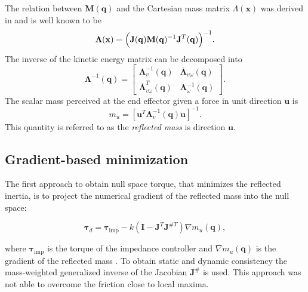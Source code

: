 The relation between $\mathbf{M}(\mathbf{q})$ and the Cartesian mass matrix $\Lambda(\mathbf{x})$ was derived in \cite{khatib1995} and is well known to be 
\begin{equation}
\mathbf{\Lambda}(\mathbf{x}) = \Bigl ( \mathbf{J}(\mathbf{q}) \mathbf{M}(\mathbf{q})^{-1} \mathbf{J}^{T}(\mathbf{q}) \Bigr )^{-1}. \label{eq:lambda}
\end{equation}
The inverse of the kinetic energy matrix can be decomposed into
\begin{equation}
\mathbf{\Lambda}^{-1}(\mathbf{q}) = 
\begin{bmatrix}
\mathbf{\Lambda}_{v}^{-1}(\mathbf{q}) & \overline{\mathbf{\Lambda}}_{v\omega}(\mathbf{q}) \\
\overline{\mathbf{\Lambda}}_{v\omega}^T(\mathbf{q}) & \mathbf{\Lambda}_{\omega}^{-1}(\mathbf{q})
\end{bmatrix}.
\end{equation}
The scalar mass perceived at the end effector given a force in unit direction $\mathbf{u}$ is
\begin{equation}
m_{u} = [\mathbf{u}^T \mathbf{\Lambda}_{v}^{-1}(\mathbf{q})   \mathbf{u}]^{-1}   .  \label{eq:reflected_robot_mass} 
\end{equation}
This quantity is referred to as the \emph{reflected mass} is direction $\mathbf{u}$.





\subsection{Gradient-based minimization}
\label{subsec:gbm_7DOF}

The first approach to obtain null space torque, that minimizes the reflected inertia, is to project the numerical gradient of the reflected mass into the null space:
 
\begin{equation}
\mathbf{\tau}_d = \mathbf{\tau}_\mathrm{imp} - k (\mathbf{I} - \mathbf{J}^T \mathbf{J}^{\#T}) \nabla m_u(\mathbf{q}), \label{eq:gbm_nico}
\end{equation}

where $\mathbf{\tau}_\mathrm{imp}$ is the torque of the impedance controller and $\nabla m_u(\mathbf{q})$ is the gradient of the reflected mass \cite{paper_iros2017}. To obtain static and dynamic consistency \cite{khatib1995} the mass-weighted generalized inverse of the Jacobian $\mathbf{J}^{\#}$ is used.
This approach was not able to overcome the friction close to local maxima. 




